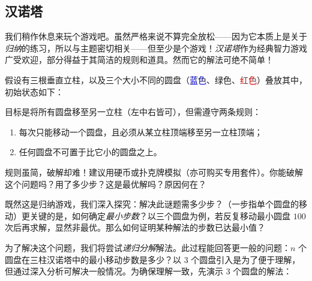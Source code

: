 \subsection{汉诺塔}

我们稍作休息来玩个游戏吧。虽然严格来说不算完全放松——因为它本质上是关于\emph{归纳}的练习，所以与主题密切相关——但至少是个游戏！\emph{汉诺塔}作为经典智力游戏广受欢迎，部分得益于其简洁的规则和道具。然而它的解法可绝不简单！

假设有三根垂直立柱，以及三个大小不同的圆盘（\textcolor{blue}{蓝色}、\textcolor{olivegreen}{绿色}、\textcolor{red}{红色}）叠放其中，初始状态如下：
\begin{center}
\end{center}
目标是将所有圆盘移至另一立柱（左中右皆可），但需遵守两条规则：
\begin{enumerate}
    \item 每次只能移动一个圆盘，且必须从某立柱顶端移至另一立柱顶端；
    \item 任何圆盘不可置于比它小的圆盘之上。
\end{enumerate}
规则虽简，破解却难！建议用硬币或扑克牌模拟（亦可购买专用套件）。你能破解这个问题吗？用了多少步？这是最优解吗？原因何在？

既然这是归纳游戏，我们深入探究：解决此谜题需多少步？（一步指单个圆盘的移动）更关键的是，如何确定\emph{最小步数}？以三个圆盘为例，若反复移动最小圆盘 $100$ 次后再求解，显然非最优。那么如何证明某种解法的步数已达最小值？

为了解决这个问题，我们将尝试\emph{递归分解}解法。此过程能回答更一般的问题：$n$ 个圆盘在三柱汉诺塔中的最小移动步数是多少？以 $3$ 个圆盘引入是为了便于理解，但通过深入分析可解决一般情况。为确保理解一致，先演示 $3$ 个圆盘的解法：

